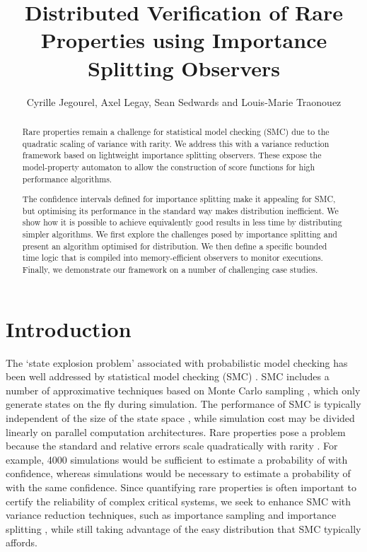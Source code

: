 \documentclass{llncs}
\begin{document}
\title{Distributed Verification of Rare Properties using Importance Splitting
Observers}


\author{Cyrille Jegourel, Axel Legay, Sean Sedwards and Louis-Marie Traonouez}


\maketitle
\begin{abstract}
Rare properties remain a challenge for statistical model checking
(SMC) due to the quadratic scaling of variance with rarity. We address
this with a variance reduction framework based on lightweight importance
splitting observers. These expose the model-property automaton to
allow the construction of score functions for high performance algorithms.

The confidence intervals defined for importance splitting make it
appealing for SMC, but optimising its performance in the standard
way makes distribution inefficient. We show how it is possible to
achieve equivalently good results in less time by distributing simpler
algorithms. We first explore the challenges posed by importance splitting
and present an algorithm optimised for distribution. We then define
a specific bounded time logic that is compiled into memory-efficient
observers to monitor executions. Finally, we demonstrate our framework
on a number of challenging case studies.
\end{abstract}


\section{Introduction}

The `state explosion problem' \cite{ClarkeEmersonAllenSifakis2009}
associated with probabilistic model checking has been well addressed
by statistical model checking (SMC) \cite{YounesKwiatkowskaNormanParker2006}.
SMC includes a number of approximative techniques based on Monte Carlo
sampling \cite{MetropolisUlam1949}, which only generate states on
the fly during simulation. The performance of SMC is typically independent
of the size of the state space \cite{Niederreiter1992}, while simulation
cost may be divided linearly on parallel computation architectures.
Rare properties pose a problem because the standard and relative errors
scale quadratically with rarity \cite{HammersleyHandscomb1964,RubinoTuffin2009}.
For example, 4000 simulations would be sufficient to estimate a probability
of  with  confidence, whereas 
simulations would be necessary to estimate a probability of 
with the same confidence. Since quantifying rare properties is often
important to certify the reliability of complex critical systems,
we seek to enhance SMC with variance reduction techniques, such as
importance sampling and importance splitting \cite{KahnHarris1951,HammersleyHandscomb1964,RubinoTuffin2009},
while still taking advantage of the easy distribution that SMC typically
affords.
\end{document}
